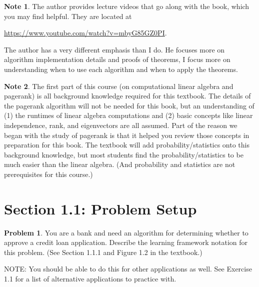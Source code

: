 \documentclass[10pt]{article}
\theoremstyle{definition}
\newtheorem{problem}{Problem}
\newtheorem{note}{Note}
\begin{document}
\begin{note}
The author provides lecture videos that go along with the book, which you may find helpful.
They are located at
\begin{center}
\url{https://www.youtube.com/watch?v=mbyG85GZ0PI}.
\end{center}
The author has a very different emphasis than I do.
He focuses more on algorithm implementation details and proofs of theorems,
I focus more on understanding when to use each algorithm and when to apply the theorems.
\end{note}

\begin{note}
The first part of this course (on computational linear algebra and pagerank) is all background knowledge required for this textbook.
The details of the pagerank algorithm will not be needed for this book,
but an understanding of (1) the runtimes of linear algebra computations and (2) basic concepts like linear independence, rank, and eigenvectors are all assumed.
Part of the reason we began with the study of pagerank is that it helped you review those concepts in preparation for this book.
The textbook will add probability/statistics onto this background knowledge,
but most students find the probability/statistics to be much easier than the linear algebra.
(And probability and statistics are not prerequisites for this course.)
\end{note}


\newpage
\section{Section 1.1: Problem Setup}

\begin{problem}
    You are a bank and need an algorithm for determining whether to approve a credit loan application.
    Describe the learning framework notation for this problem.
    (See Section 1.1.1 and Figure 1.2 in the textbook.)

    NOTE: You should be able to do this for other applications as well.
    See Exercise 1.1 for a list of alternative applications to practice with.
\end{problem}
\end{document}
